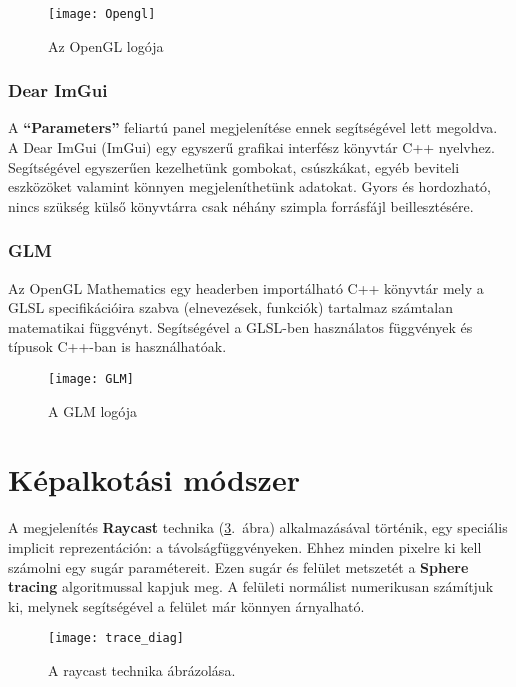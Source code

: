 \begin{figure}[H]
	\centering
	\texttt{[image: Opengl]}
	\caption{Az OpenGL logója}
	\label{fig:Opengl}
\end{figure}

\subsubsection{Dear ImGui}
A \textbf{``Parameters''} feliartú panel megjelenítése ennek segítségével lett megoldva. A Dear ImGui (ImGui) egy egyszerű grafikai interfész könyvtár C++ nyelvhez. Segítségével egyszerűen kezelhetünk gombokat, csúszkákat, egyéb beviteli eszközöket valamint könnyen megjeleníthetünk adatokat. Gyors és hordozható, nincs szükség külső könyvtárra csak néhány szimpla forrásfájl beillesztésére. \cite{ocornuti13:online}

\subsubsection{GLM}

Az OpenGL Mathematics egy headerben importálható C++ könyvtár mely a GLSL specifikációira szabva (elnevezések, funkciók) tartalmaz számtalan matematikai függvényt. Segítségével a GLSL-ben használatos függvények és típusok C++-ban is használhatóak. \cite{OpenGLMa34:online}

\begin{figure}[H]
	\centering
	\texttt{[image: GLM]}
	\caption{A GLM logója}
	\label{fig:GLM}
\end{figure}

\section{Képalkotási módszer}
\label{sec:kepmod}

A megjelenítés \textbf{Raycast} technika (\ref{fig:trace_diag}.~ábra) alkalmazásával történik, egy speciális implicit reprezentáción: a távolságfüggvényeken. Ehhez minden pixelre ki kell számolni egy sugár paramétereit. Ezen sugár és felület metszetét a \textbf{Sphere tracing} algoritmussal kapjuk meg. A felületi normálist numerikusan számítjuk ki, melynek segítségével a felület már könnyen árnyalható.

\begin{figure}[H]
	\centering
	\texttt{[image: trace\_diag]}
	\caption{A raycast technika ábrázolása. \cite{FileRayt97:online}}
	\label{fig:trace_diag}
\end{figure}

